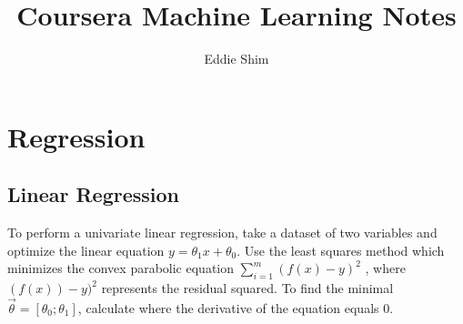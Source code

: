 \documentclass[titlepage]{article}
\author{Eddie Shim}
\title{Coursera Machine Learning Notes}
\begin{document}
	\maketitle
	
	\section{Regression}
	\subsection{Linear Regression}
	To perform a univariate linear regression, take a dataset of two variables and optimize the linear equation $y = \theta_1 x + \theta_0$. Use the least squares method which minimizes the convex parabolic equation $\sum_{i=1}^{m} (f(x) - y)^2$ , where $(f(x)) -y)^2$ represents the residual squared. To find the minimal $\vec \theta = [\theta_0 ; \theta_1]$, calculate where the derivative of the equation equals 0. 
	
\end{document}
